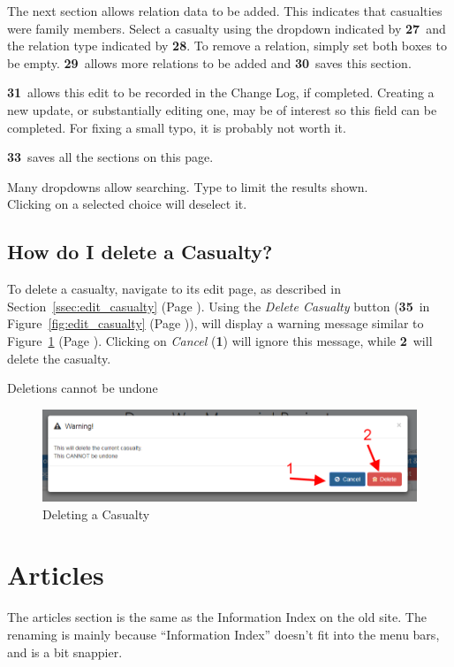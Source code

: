 \documentclass[12pt]{article}
\newcommand{\marker}[1]{\color{red}\textbf{#1}\color{black}}
\newcommand{\myref}[1]{\ref{#1} {\scriptsize(Page \pageref{#1})}}
\begin{document}
The next section allows relation data to be added. This indicates that casualties were family members. Select a casualty using the dropdown indicated by \marker{27}\ and the relation type indicated by \marker{28}. To remove a relation, simply set both boxes to be empty. \marker{29}\ allows more relations to be added and \marker{30}\ saves this section.

\marker{31}\ allows this edit to be recorded in the Change Log, if completed. Creating a new update, or substantially editing one, may be of interest so this field can be completed. For fixing a small typo, it is probably not worth it.

\marker{33}\ saves all the sections on this page.

\begin{infoBox}
Many dropdowns allow searching. Type to limit the results shown. \\
Clicking on a selected choice will deselect it.
\end{infoBox}

\FloatBarrier
\subsection{How do I delete a Casualty?}\label{ssec:delete_casualty}
To delete a casualty, navigate to its edit page, as described in Section~\myref{ssec:edit_casualty}. Using the \textit{Delete Casualty} button (\marker{35}\ in Figure~\myref{fig:edit_casualty}), will display a warning message similar to Figure~\myref{fig:delete_casualty}. Clicking on \textit{Cancel} (\marker{1}) will ignore this message, while \marker{2}\ will delete the casualty.

\begin{warningBox}
Deletions cannot be undone
\end{warningBox}

\begin{figure}[h]
  \centering
 \includegraphics[width=.9\textwidth]{pics/delete_casualty.png}
	\caption{Deleting a Casualty}\label{fig:delete_casualty}
\end{figure}

\newpage
\FloatBarrier
\section{Articles}\label{sec:articles}
The articles section is the same as the Information Index on the old site. The renaming is mainly because ``Information Index'' doesn't fit into the menu bars, and is a bit snappier.
\end{document}
